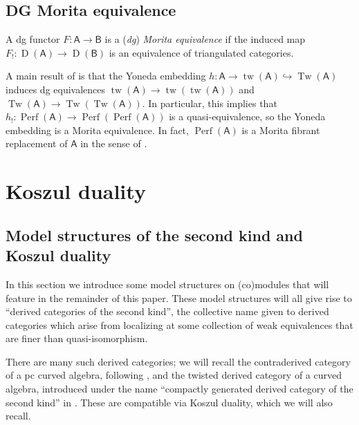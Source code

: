 \documentclass[a4paper]{amsart}
\theoremstyle{plain}
\theoremstyle{definition}
\theoremstyle{remark}
\DeclareMathOperator{\Cof}{Cof}
\DeclareMathOperator{\D}{D}
\DeclareMathOperator{\Perf}{Perf}
\DeclareMathOperator{\tw}{tw}
\DeclareMathOperator{\Tw}{Tw}
\newcommand{\cat}[1]{\mathsf{#1}}
\numberwithin{equation}{section}
\newif\ifshowcomments
\newcommand{\comment}[1]{\ifshowcomments{\color{cyan}{#1}}\else\ignorespaces\fi}
\theoremstyle{plain}
\begin{document}
	\subsection{DG Morita equivalence}
	
	A dg functor $F \colon \cat{A} \to \cat{B}$ is a (\emph{dg}) \emph{Morita equivalence} if the induced map $F_! \colon \D(\cat{A}) \to \D(\cat{B})$ is an equivalence of triangulated categories.
	
	A main result of \cite{bk91} is that the Yoneda embedding $h \colon \cat{A} \to \tw(\cat{A}) \hookrightarrow \Tw(\cat{A})$ induces dg equivalences $\tw(\cat{A}) \to \tw(\tw(\cat{A}))$ and $\Tw(\cat{A}) \to \Tw(\Tw(\cat{A}))$.
	In particular, this implies that $h_! \colon \Perf(\cat{A}) \to \Perf(\Perf(\cat{A}))$ is a quasi-equivalence, so the Yoneda embedding is a Morita equivalence.
	In fact, $\Perf(\cat{A})$ is a Morita fibrant replacement of $\cat{A}$ in the sense of \cite[Section~4.6]{kel06a}.
	
\section{Koszul duality}\label{sect:koszul}
	
	\subsection{Model structures of the  second kind and Koszul duality}
	
	In this section we introduce some model structures on (co)modules that will feature in the remainder of this paper.
	These model structures will all give rise to ``derived categories of the  second kind'', the collective name given to derived categories which arise from localizing at some collection of weak equivalences that are finer than quasi-isomorphism.
	
	There are many such derived categories; we will recall the contraderived category of a pc curved algebra, following \cite{pos11}, and the twisted derived category of a curved algebra, introduced under the name ``compactly generated derived category of the second kind'' in \cite{gl21}.
	These are compatible via Koszul duality, which we will also recall.
	
\end{document}
